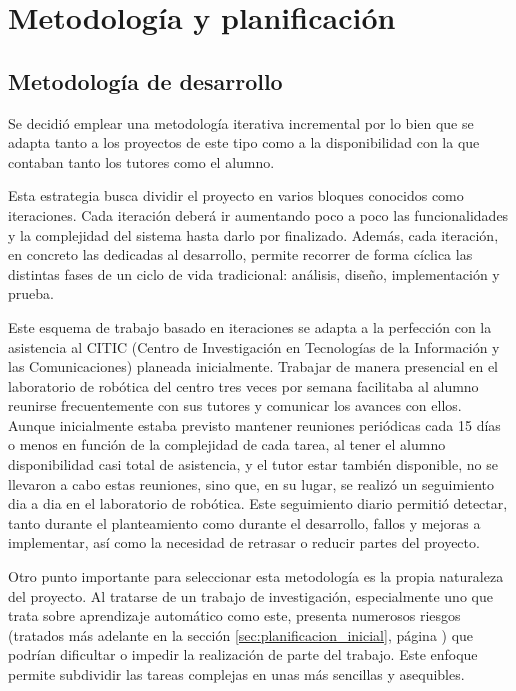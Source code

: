 \chapter{Metodología y planificación}
\label{chap:metodologia_planificacion}

\section{Metodología de desarrollo}
\label{sec:metodologia_desarrollo}

Se decidió emplear una metodología iterativa incremental por lo bien que se adapta tanto a los 
proyectos de este tipo como a la disponibilidad con la que contaban tanto los tutores como el alumno. 

Esta estrategia busca dividir el proyecto en varios bloques conocidos como iteraciones. Cada 
iteración deberá ir aumentando poco a poco las funcionalidades y la complejidad del sistema 
hasta darlo por finalizado. Además, cada iteración, en concreto las dedicadas al desarrollo, 
permite recorrer de forma cíclica las distintas fases de un ciclo de vida tradicional: análisis, 
diseño, implementación y prueba.

Este esquema de trabajo basado en iteraciones se adapta a la perfección con la asistencia al CITIC (Centro de Investigación en 
Tecnologías de la Información y las Comunicaciones) planeada inicialmente. Trabajar de manera presencial en el laboratorio de robótica 
del centro tres veces por semana facilitaba al alumno reunirse frecuentemente con sus tutores y comunicar los avances con ellos.
Aunque inicialmente estaba previsto mantener reuniones periódicas cada 15 días o menos en función de la complejidad de cada tarea, al 
tener el alumno disponibilidad casi total de asistencia, y el tutor estar también disponible, no se llevaron a cabo estas reuniones, sino 
que, en su lugar, se realizó un seguimiento dia a dia en el laboratorio de robótica. Este seguimiento diario permitió detectar, tanto durante el 
planteamiento como durante el desarrollo, fallos y mejoras a implementar, así como la necesidad de retrasar o reducir partes del proyecto.

Otro punto importante para seleccionar esta metodología es la propia naturaleza del proyecto. Al tratarse 
de un trabajo de investigación, especialmente uno que trata sobre aprendizaje automático como este, presenta 
numerosos riesgos (tratados más adelante en la sección \ref{sec:planificacion_inicial}, página \pageref{sec:planificacion_inicial}) 
que podrían dificultar o impedir la realización de parte del trabajo. Este enfoque permite subdividir 
las tareas complejas en unas más sencillas y asequibles. 

